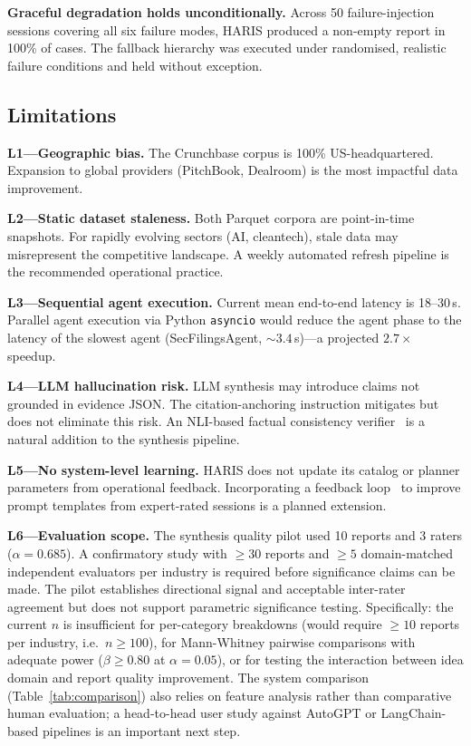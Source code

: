 \documentclass[preprint,12pt]{elsarticle}
\begin{document}
\textbf{Graceful degradation holds unconditionally.} Across 50 failure-injection
sessions covering all six failure modes, HARIS produced a non-empty report in
100\% of cases. The fallback hierarchy was executed under randomised, realistic
failure conditions and held without exception.

\subsection{Limitations}
\label{sec:limitations}

\textbf{L1---Geographic bias.} The Crunchbase corpus is 100\% US-headquartered.
Expansion to global providers (PitchBook, Dealroom) is the most impactful data
improvement.

\textbf{L2---Static dataset staleness.} Both Parquet corpora are point-in-time
snapshots. For rapidly evolving sectors (AI, cleantech), stale data may
misrepresent the competitive landscape. A weekly automated refresh pipeline is
the recommended operational practice.

\textbf{L3---Sequential agent execution.} Current mean end-to-end latency is
18--30\,s. Parallel agent execution via Python \texttt{asyncio} would reduce the
agent phase to the latency of the slowest agent (SecFilingsAgent,
${\sim}3.4$\,s)---a projected $2.7\times$ speedup.

\textbf{L4---LLM hallucination risk.} LLM synthesis may introduce claims not
grounded in evidence JSON. The citation-anchoring instruction mitigates but does
not eliminate this risk. An NLI-based factual consistency verifier~\cite{honovich2022true}
is a natural addition to the synthesis pipeline.

\textbf{L5---No system-level learning.} HARIS does not update its catalog or
planner parameters from operational feedback. Incorporating a feedback
loop~\cite{ouyang2022training} to improve prompt templates from expert-rated
sessions is a planned extension.

\textbf{L6---Evaluation scope.} The synthesis quality pilot used 10 reports and
3 raters ($\alpha{=}0.685$). A confirmatory study with $\ge 30$ reports and
$\ge 5$ domain-matched independent evaluators per industry is required before
significance claims can be made. The pilot establishes directional signal and
acceptable inter-rater agreement but does not support parametric significance
testing. Specifically: the current $n$ is insufficient for per-category breakdowns
(would require $\ge 10$ reports per industry, i.e.\ $n \ge 100$), for
Mann-Whitney pairwise comparisons with adequate power ($\beta \ge 0.80$ at
$\alpha = 0.05$), or for testing the interaction between idea domain and report
quality improvement. The system comparison (Table~\ref{tab:comparison}) also
relies on feature analysis rather than comparative human evaluation; a head-to-head
user study against AutoGPT or LangChain-based pipelines is an important next step.
\end{document}
